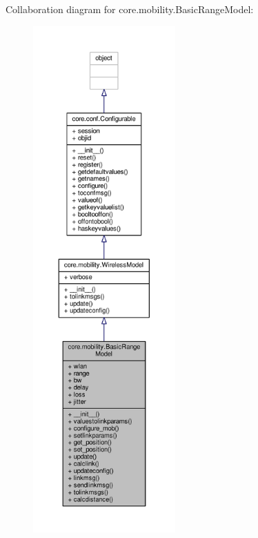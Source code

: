 Collaboration diagram for core.\+mobility.\+Basic\+Range\+Model\+:
\nopagebreak
\begin{figure}[H]
\begin{center}
\leavevmode
\includegraphics[height=550pt]{classcore_1_1mobility_1_1_basic_range_model__coll__graph}
\end{center}
\end{figure}
